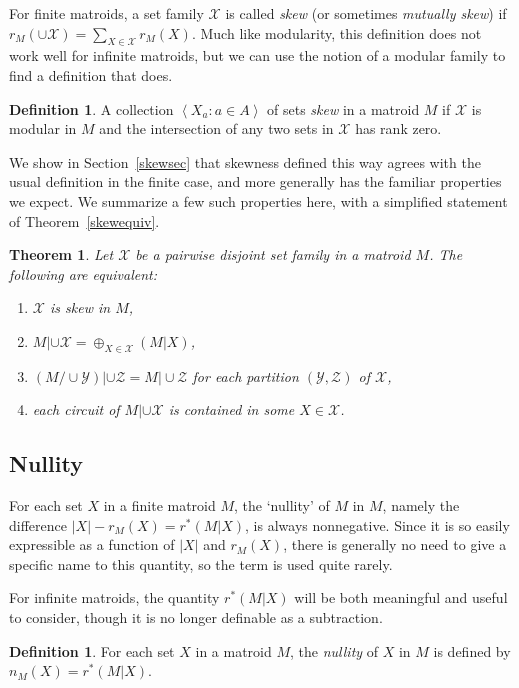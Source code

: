 \documentclass{amsart}
\theoremstyle{plain}
\newtheorem{theorem}{Theorem}[section]
\newcounter{defn}
\theoremstyle{definition}
\newtheorem{definition}[defn]{Definition}
\newcommand{\cX}{\mathcal{X}}
\newcommand{\cY}{\mathcal{Y}}
\newcommand{\cZ}{\mathcal{Z}}
\newcommand{\con}{/}
\newcommand{\br}[1]{\left(#1\right)}
\newcommand{\ab}[1]{\left\langle#1\right\rangle}
\begin{document}
For finite matroids, a set family $\cX$ is called \emph{skew} (or sometimes \emph{mutually skew}) if 
$r_M\br{\cup \cX} = \sum_{X \in \cX}r_M(X)$. 
Much like modularity, this definition does not work well for infinite matroids, 
but we can use the notion of a modular family to find a definition that does.

\begin{definition}\label{skewdef}
  A collection $\ab{X_a : a \in A}$ of sets \emph{skew} in a matroid $M$ if $\cX$ is modular in $M$ and the intersection of any two sets in $\cX$ has rank zero.  
\end{definition}

We show in Section~\ref{skewsec} that
skewness defined this way agrees with the usual definition in the finite case,
and more generally has the familiar properties we expect. We summarize a few such properties here, 
with a simplified statement of Theorem~\ref{skewequiv}.

\begin{theorem}\label{skewequivintro}
  Let $\cX$ be a pairwise disjoint set family in a matroid $M$. 
  The following are equivalent: 
  \begin{enumerate}[(1)]
    \item $\cX$ is skew in $M$, 
    \item $M | \cup \cX = \oplus_{X \in \cX} (M | X)$, 
    \item $(M \con \cup \cY) | \cup \cZ = M | \cup \cZ$ for each partition $(\cY, \cZ)$ of $\cX$, 
    \item each circuit of $M | \cup \cX$ is contained in some $X \in \cX$. 
  \end{enumerate}
\end{theorem}

\subsection*{Nullity}

For each set $X$ in a finite matroid $M$, the `nullity' of $M$ in $M$, 
namely the difference $|X| - r_M(X) = r^*(M | X)$, is always 
nonnegative. Since it is so easily expressible as a function of $|X|$ and $r_M(X)$,
there is generally no need to give a specific name to this quantity, 
so the term is used quite rarely. 

For infinite matroids, the quantity $r^*(M|X)$ will be both meaningful 
and useful to consider, though it is no longer definable as a subtraction. 

\begin{definition}
  For each set $X$ in a matroid $M$, the \emph{nullity} of $X$ in $M$ is defined by $n_M(X) = r^*(M|X)$. 
\end{definition}
\end{document}
